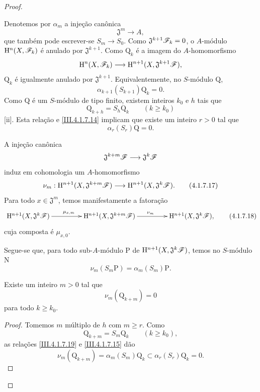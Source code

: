 \begin{proof}
\begin{env}[4.1.7.13]
\label{III.4.1.7.13}
Denotemos por $\alpha_m$ a injeção canônica
\[
  \mathfrak{J}^m\longrightarrow A,
\]
que também pode escrever-se $S_m\to S_0$.
Como $\mathfrak{J}^{k+1}\mathscr{F}_k=0$, o $A$-módulo
$\mathrm{H}^n(X,\mathscr{F}_k)$ é anulado por $\mathfrak{J}^{k+1}$.
Como $\mathrm{Q}_k$ é a imagem do $A$-homomorfismo
\[
  \mathrm{H}^n(X,\mathscr{F}_k)
  \longrightarrow
  \mathrm{H}^{n+1}(X,\mathfrak{J}^{k+1}\mathscr{F}),
\]
$\mathrm{Q}_k$ é igualmente anulado por $\mathfrak{J}^{k+1}$.
Equivalentemente, no $S$-módulo $\mathrm{Q}$,
\[
  \alpha_{k+1}(S_{k+1})\mathrm{Q}_k=0.
  \tag{4.1.7.14}
  \label{III.4.1.7.14}
\]
Como $\mathrm{Q}$ é um $S$-módulo de tipo finito, existem inteiros
$k_0$ e $h$ tais que
\[
  \mathrm{Q}_{k+h}=S_h\mathrm{Q}_k
  \qquad(k\geq k_0)
\]
[ii].
Esta relação e \eqref{III.4.1.7.14} implicam que existe um inteiro
$r>0$ tal que
\[
  \alpha_r(S_r)\mathrm{Q}=0.
  \tag{4.1.7.15}
  \label{III.4.1.7.15}
\]
\end{env}

\begin{env}[4.1.7.16]
\label{III.4.1.7.16}
A injeção canônica
\[
  \mathfrak{J}^{k+m}\mathscr{F}
  \longrightarrow
  \mathfrak{J}^k\mathscr{F}
\]
induz em cohomologia um $A$-homomorfismo
\[
  \nu_m:
  \HH^{n+1}(X,\mathfrak{J}^{k+m}\sh{F})
  \longrightarrow
  \HH^{n+1}(X,\mathfrak{J}^k\sh{F}).
  \tag{4.1.7.17}
  \label{III.4.1.7.17}
\]
Para todo $x\in\mathfrak{J}^m$, temos manifestamente a
fatoração
\[
  \xymatrix@C=4.5em{
    \HH^{n+1}(X,\mathfrak{J}^k\sh{F})
      \ar[r]^{\mu_{x,m}}
    &
    \HH^{n+1}(X,\mathfrak{J}^{k+m}\sh{F})
      \ar[r]^{\nu_m}
    &
    \HH^{n+1}(X,\mathfrak{J}^k\sh{F}),
  }
  \tag{4.1.7.18}
  \label{III.4.1.7.18}
\]
cuja composta é $\mu_{x,0}$.
\end{env}


Segue-se que, para todo sub-$A$-módulo $\mathrm{P}$ de
$\mathrm{H}^{n+1}(X,\mathfrak{J}^k\mathscr{F})$, temos no $S$-módulo
$\mathrm{N}$
\[
  \nu_m(S_m\mathrm{P})
  =
  \alpha_m(S_m)\mathrm{P}.
  \tag{4.1.7.19}
  \label{III.4.1.7.19}
\]

\begin{lemma}[4.1.7.20]
\label{III.4.1.7.20}
Existe um inteiro $m>0$ tal que
\[
  \nu_m(\mathrm{Q}_{k+m})=0
\]
para todo $k\geq k_0$.
\end{lemma}

\begin{proof}
Tomemos $m$ múltiplo de $h$ com $m\geq r$.
Como
\[
  \mathrm{Q}_{k+m}=S_m\mathrm{Q}_k
  \qquad(k\geq k_0),
\]
as relações \eqref{III.4.1.7.19} e \eqref{III.4.1.7.15} dão
\[
  \nu_m(\mathrm{Q}_{k+m})
  =
  \alpha_m(S_m)\mathrm{Q}_k
  \subset
  \alpha_r(S_r)\mathrm{Q}_k
  =
  0.
\]
\end{proof}


\end{proof}
